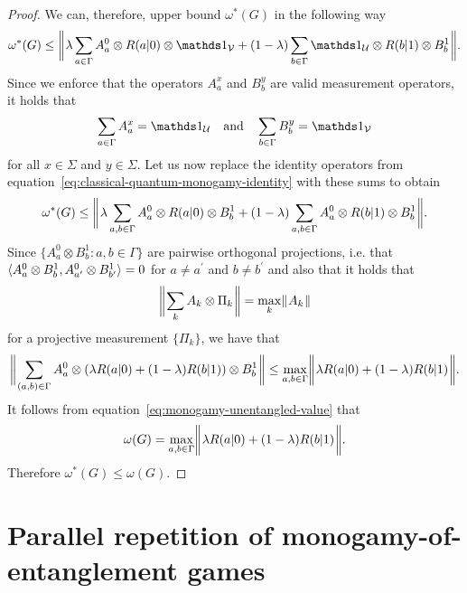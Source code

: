 \begin{proof}
We can, therefore, upper bound $\omega^*(G)$ in the following way 
\begin{align} \label{eq:classical-quantum-monogamy-identity}
	\omega^*(G) \leq \biggnorm{\lambda \sum_{a \in \Gamma} A_a^0 \otimes  R(a|0) \otimes \I_{\V} + (1 - \lambda) \sum_{b \in \Gamma} \I_{\U} \otimes R(b|1) \otimes B_b^1}.
\end{align}
Since we enforce that the operators $A_a^x$ and $B_b^y$ are valid measurement operators, it holds that 
\begin{align}
	\sum_{a \in \Gamma} A_a^x = \I_{\U} \quad \textnormal{and} \quad \sum_{b \in \Gamma} B_b^y = \I_{\V}
\end{align}
for all $x \in \Sigma$ and $y \in \Sigma$. Let us now replace the identity operators from equation~\eqref{eq:classical-quantum-monogamy-identity} with these sums to obtain
\begin{align}
	\omega^*(G) \leq \biggl\lVert\mspace{1mu} \lambda \sum_{a,b \in \Gamma} A_a^0 \otimes R(a|0) \otimes B_b^1 + (1 - \lambda) \sum_{a,b \in \Gamma} A_a^0 \otimes R(b|1) \otimes B_b^1 \mspace{1mu}\biggr\rVert.
\end{align}
Since $\{A_a^0 \otimes B_b^1 : a,b \in \Gamma\}$ are pairwise orthogonal projections, i.e. that $\langle A_a^0 \otimes B_b^1 , A_{a^{\prime}}^0 \otimes B_{b^{\prime}}^1\rangle = 0$ for $a \not= a^{\prime}$ and $b \not= b^{\prime}$ and also that it holds that 
\begin{align}
	\biggl\lVert\mspace{1mu} \sum_{k} A_k \otimes \Pi_k \mspace{1mu}\biggr\rVert = \max_k \lVert\mspace{1mu} A_k \mspace{1mu}\rVert
\end{align}
for a projective measurement $\{\Pi_k\}$, we have that 
\begin{align}
	\biggl\lVert\mspace{1mu} \sum_{(a,b) \in \Gamma} A_a^0 \otimes \left( \lambda R(a|0) + (1-\lambda) R(b|1) \right) \otimes B_b^1  \mspace{1mu}\biggr\rVert \leq \max_{a,b \in \Gamma} \biggl\lVert\mspace{1mu}  \lambda R(a|0) + (1-\lambda)R(b|1)  \mspace{1mu}\biggr\rVert.
\end{align}
It follows from equation~\eqref{eq:monogamy-unentangled-value} that 
\begin{align}
	\omega(G) = \max_{a,b \in \Gamma} \biggl\lVert\mspace{1mu}  \lambda R(a|0) + (1-\lambda) R(b|1)  \mspace{1mu}\biggr\rVert.
\end{align}
Therefore $\omega^*(G) \leq \omega(G)$.

\end{proof}

\section{Parallel repetition of monogamy-of-entanglement games} \label{sec:parallel-rep-moe-games}

